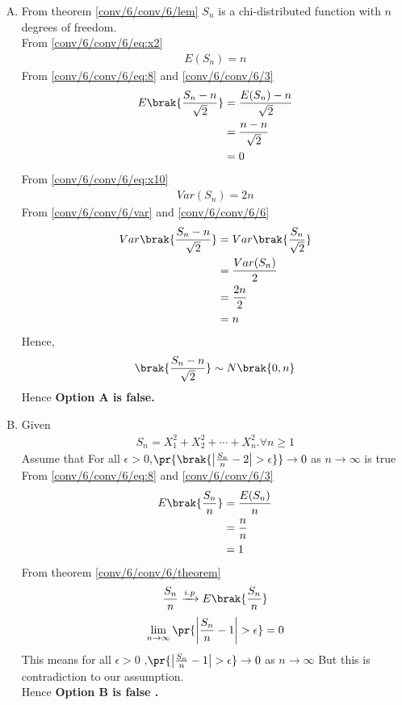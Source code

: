      \begin{enumerate}[(A)]
    \item
    From theorem \eqref{conv/6/conv/6/lem} $S_n$ is a chi-distributed function with $n$ degrees of freedom.\\
    From \eqref{conv/6/conv/6/eq:x2} 
    \begin{align}
        E(S_n)=n \label{conv/6/eq:8}
    \end{align}
    From \eqref{conv/6/conv/6/eq:8} and \eqref{conv/6/conv/6/3}
    \begin{align}
        E\brak{\frac{S_{n}-n}{\sqrt{2}}}&=\frac{E(S_n)-n}{\sqrt{2}}\\
         &=\frac{n-n}{\sqrt{2}}\\
        &=0
    \end{align}
    From \eqref{conv/6/conv/6/eq:x10}
    \begin{align}
        Var(S_n)= 2n\label{conv/6/var}
    \end{align}
    From \eqref{conv/6/conv/6/var} and \eqref{conv/6/conv/6/6}
    \begin{align}
        Var\brak{\frac{S_{n}-n}{\sqrt{2}}}
        &= Var\brak{\frac{S_n}{\sqrt{2}}}\\
        &=\frac{Var(S_n)}{2}\\
        &=\frac{2n}{2}\\
        &=n
    \end{align}
    Hence,
    \begin{align}
        \brak{\frac{S_{n}-n}{\sqrt{2}}}\sim N\brak{0,n}
    \end{align}
    Hence \textbf{Option A is false.}
    \item Given 
    \begin{align}
        S_{n}=X_{1}^2+X_{2}^2+\cdots+X_{n}^2.\forall n\geq 1
    \end{align}
    Assume that For all $\epsilon > 0$,$\pr{\brak{\left|{\frac{S_n}{n}-2}\right|>\epsilon}}\to 0$ as $n \to \infty$ is true
    \\From \eqref{conv/6/conv/6/eq:8} and \eqref{conv/6/conv/6/3}
    \begin{align}
        E\brak{\frac{S_n}{n}}&=\frac{E(S_n)}{n}\\
            &=\frac{n}{n}\\
            &=1\label{conv/6/25}
    \end{align}
    From theorem \eqref{conv/6/conv/6/theorem}
    \begin{align}
        \frac{S_n}{n} \xrightarrow{i.p}  E\brak{\frac{S_n}{n}}
    \end{align}
    \begin{align}
        \lim_{n \to \infty} \pr{\left|{\frac{S_n}{n}-1}\right|>\epsilon}=0
    \end{align}
    This means for all $\epsilon>0$ ,$\pr{\left|{\frac{S_n}{n}-1}\right|>\epsilon}\to 0$ as $n \to \infty$
    But this is contradiction to our assumption.\\
    Hence \textbf{Option B is false .}
     

\end{enumerate}
